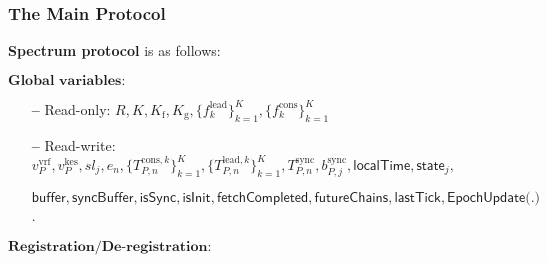 \subsubsection{The Main Protocol}
\textbf{Spectrum protocol} is as follows:\label{apndx:spectrum-protocol}
\begin{protocol}
    \caption{$\textsf{Spectrum}(P, \text{sid}; \mathcal{G}_{\text{Ledger}}, \mathcal{G}_{\text{ImpLClock}}, \mathcal{H}, \mathcal{F}^{\Delta}_{\text{N-MC}})$}
    \begin{algorithmic}
        \State $\textbf{Global variables:}$
        \begin{itemize}
            \item[\textbf{--}] Read-only: $R, K, K_{\text{f}}, K_{\text{g}}, \{f^{\text{lead}}_k\}_{k=1}^K, \{f^{\text{cons}}_k\}_{k=1}^K$
            \item[\textbf{--}] Read-write: $v^{\text{vrf}}_P, v^{\text{kes}}_P, sl_j, e_n, \{T^{\text{cons}, k}_{P, n}\}_{k=1}^K, \{T^{\text{lead}, k}_{P, n}\}_{k=1}^K, T^{\text{sync}}_{P, n}, b^{\text{sync}}_{P, j}, \textsf{localTime}, \textsf{state}_{j},$
            \item[] $\textsf{buffer}, \textsf{syncBuffer}, \textsf{isSync}, \textsf{isInit}, \textsf{fetchCompleted}, \textsf{futureChains}, \textsf{lastTick}, \textsf{EpochUpdate(.)}$.
        \end{itemize}
        \State $\textbf{Registration/De-registration:}$


\end{algorithmic}
\end{protocol}
